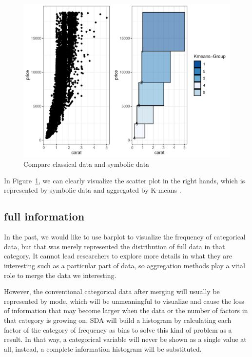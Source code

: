 \documentclass[article]{jss}
\begin{document}
\begin{figure}[H]
\centering
\includegraphics{ggESDA_Jiang&Wu_20210915-compare}
\caption{\label{fig:compare} Compare classical data and symbolic data}
\end{figure}

In Figure~\ref{fig:compare}, we can clearly visualize the scatter plot in the right hands, which is represented by symbolic data and aggregated by K-means \cite{Jin:2010}. 


\subsection{full information}

In the past, we would like to use barplot to visualize the frequency of categorical data, but that was merely represented the distribution of full data in that category. It cannot lead researchers to explore more details in what they are interesting such as a particular part of data, so aggregation methods play a vital role to merge the data we interesting.

However, the conventional categorical data after merging will usually be represented by mode, which will be unmeaningful to visualize and cause the loss of information that may become larger when the data or the number of factors in that category is growing on. SDA will build a histogram by calculating each factor of the category of frequency as bins to solve this kind of problem as a result. In that way, a categorical variable will never be shown as a single value at all, instead, a complete information histogram will be substituted.
\end{document}
